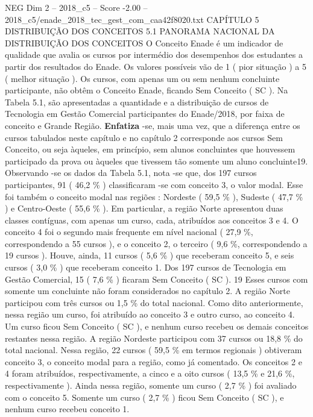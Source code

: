 \begin{textsample}{NEG Dim 2 – 2018\_c5 – Score -2.00 – 2018\_c5/enade\_2018\_tec\_gest\_com\_caa42f8020.txt}  \label{ex:f2_neg_115}
CAPÍTULO 5 DISTRIBUIÇÃO DOS CONCEITOS 5.1 PANORAMA NACIONAL DA DISTRIBUIÇÃO DOS CONCEITOS O Conceito Enade é um indicador de qualidade que avalia os cursos por intermédio dos desempenhos dos estudantes a partir dos resultados do Enade.
Os valores possíveis vão de 1 ( pior situação ) a 5 ( melhor situação ).
Os cursos, com apenas um ou sem nenhum concluinte participante, não obtêm o Conceito Enade, ficando Sem Conceito ( SC ).
Na Tabela 5.1, são apresentadas a quantidade e a distribuição de cursos de Tecnologia em Gestão Comercial participantes do Enade/2018, por faixa de conceito e Grande Região. \textbf{Enfatiza} -se, mais uma vez, que a diferença entre os cursos tabulados neste capítulo e no capítulo 2 corresponde aos cursos Sem Conceito, ou seja àqueles, em princípio, sem alunos concluintes que houvessem participado da prova ou àqueles que tivessem tão somente um aluno concluinte19.
Observando -se os dados da Tabela 5.1, nota -se que, dos 197 cursos participantes, 91 ( 46,2 \% ) classificaram -se com conceito 3, o valor modal.
Esse foi também o conceito modal nas regiões : Nordeste ( 59,5 \% ), Sudeste ( 47,7 \% ) e Centro-Oeste ( 55,6 \% ).
Em particular, a região Norte apresentou duas classes contíguas, com apenas um curso, cada, atribuídos aos conceitos 3 e 4.
O conceito 4 foi o segundo mais frequente em nível nacional ( 27,9 \%, correspondendo a 55 cursos ), e o conceito 2, o terceiro ( 9,6 \%, correspondendo a 19 cursos ).
Houve, ainda, 11 cursos ( 5,6 \% ) que receberam conceito 5, e seis cursos ( 3,0 \% ) que receberam conceito 1.
Dos 197 cursos de Tecnologia em Gestão Comercial, 15 ( 7,6 \% ) ficaram Sem Conceito ( SC ). 19 Esses cursos com somente um concluinte não foram considerados no capítulo 2.
A região Norte participou com três cursos ou 1,5 \% do total nacional.
Como dito anteriormente, nessa região um curso, foi atribuído ao conceito 3 e outro curso, ao conceito 4.
Um curso ficou Sem Conceito ( SC ), e nenhum curso recebeu os demais conceitos restantes nessa região.
A região Nordeste participou com 37 cursos ou 18,8 \% do total nacional.
Nessa região, 22 cursos ( 59,5 \% em termos regionais ) obtiveram conceito 3, o conceito modal para a região, como já comentado.
Os conceitos 2 e 4 foram atribuídos, respectivamente, a cinco e a oito cursos ( 13,5 \% e 21,6 \%, respectivamente ).
Ainda nessa região, somente um curso ( 2,7 \% ) foi avaliado com o conceito 5.
Somente um curso ( 2,7 \% ) ficou Sem Conceito ( SC ), e nenhum curso recebeu conceito 1.

\end{textsample}
